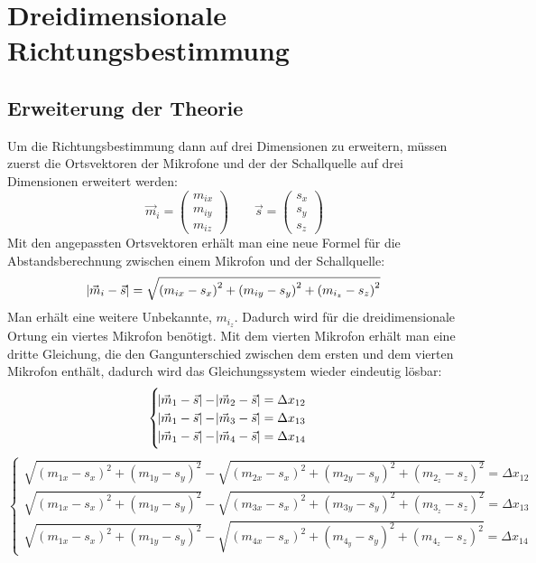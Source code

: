 \section{Dreidimensionale Richtungsbestimmung}
\subsection{Erweiterung der Theorie}
Um die Richtungsbestimmung dann auf drei Dimensionen zu erweitern, müssen zuerst die Ortsvektoren der Mikrofone und der der Schallquelle auf drei Dimensionen erweitert werden: $$\vec{m}_i = \begin{pmatrix}
m_{ix} \\
m_{iy} \\
m_{iz}
\end{pmatrix} \quad\quad
\vec{s} = \begin{pmatrix}
{s_x} \\
{s_y} \\
{s_z}
\end{pmatrix}$$
Mit den angepassten Ortsvektoren erhält man eine neue Formel für die Abstandsberechnung zwischen einem Mikrofon und der Schallquelle:
$$\abs{\vec{m}_i - \vec{s}} = \sqrt{{(m_{ix} - s_x)}^2 + {(m_{iy} - s_y)}^2 + {(m_{i_z} - s_z)}^2}$$
Man erhält eine weitere Unbekannte, $m_{i_z}$. Dadurch wird für die dreidimensionale Ortung ein viertes Mikrofon benötigt. Mit dem vierten Mikrofon erhält man eine dritte Gleichung, die den Gangunterschied zwischen dem ersten und dem vierten Mikrofon enthält, dadurch wird das Gleichungssystem wieder eindeutig lösbar:
$$\begin{cases}
\abs{\vec{m}_1 - \vec{s}} - \abs{\vec{m}_2 - \vec{s}} = \Delta{x_{12}} \\
\abs{\vec{m}_1 - \vec{s}} - \abs{\vec{m}_3 - \vec{s}} = \Delta{x_{13}} \\
\abs{\vec{m}_1 - \vec{s}} - \abs{\vec{m}_4 - \vec{s}} = \Delta{x_{14}}
\end{cases}$$
$$\begin{cases}
\sqrt{{(m_{1x} - s_x)}^2 + {(m_{1y} - s_y)}^2} - \sqrt{{(m_{2x} - s_x)}^2 + {(m_{2y} - s_y)}^2 + {(m_{2_z} - s_z)}^2} = \Delta{x_{12}} \\
\sqrt{{(m_{1x} - s_x)}^2 + {(m_{1y} - s_y)}^2} - \sqrt{{(m_{3x} - s_x)}^2 + {(m_{3y} - s_y)}^2 + {(m_{3_z} - s_z)}^2} = \Delta{x_{13}} \\
\sqrt{{(m_{1x} - s_x)}^2 + {(m_{1y} - s_y)}^2} - \sqrt{{(m_{4x} - s_x)}^2 + {(m_{4_y} - s_y)}^2 + {(m_{4_z} - s_z)}^2} = \Delta{x_{14}}
\end{cases}$$
